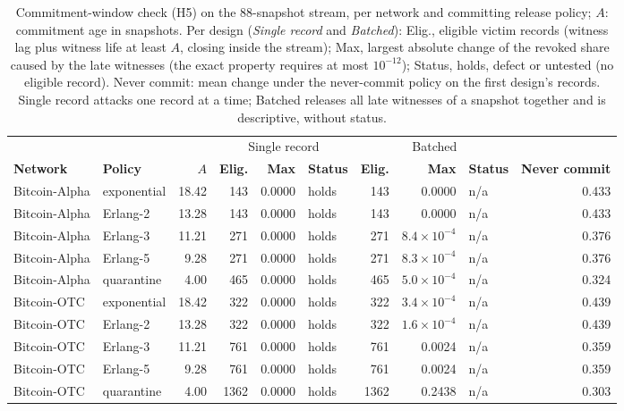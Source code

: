 \begin{table}[!t]
\centering
\scriptsize
\setlength{\tabcolsep}{3pt}
\caption{Commitment-window check (H5) on the 88-snapshot stream, per network and committing release policy; $A$: commitment age in snapshots. Per design (\emph{Single record} and \emph{Batched}): Elig., eligible victim records (witness lag plus witness life at least $A$, closing inside the stream); Max, largest absolute change of the revoked share caused by the late witnesses (the exact property requires at most $10^{-12}$); Status, holds, defect or untested (no eligible record). Never commit: mean change under the never-commit policy on the first design's records. Single record attacks one record at a time; Batched releases all late witnesses of a snapshot together and is descriptive, without status.}
\label{tab:s_s_window_88}
\begin{tabular}{@{}llrrrlrrlr@{}}
\toprule
 & & & \multicolumn{3}{c}{Single record} & \multicolumn{3}{c}{Batched} & \\
\cmidrule(lr){4-6}\cmidrule(lr){7-9}
\textbf{Network} & \textbf{Policy} & \textbf{$A$} & \textbf{Elig.} & \textbf{Max} & \textbf{Status} & \textbf{Elig.} & \textbf{Max} & \textbf{Status} & \textbf{Never commit} \\
\midrule
Bitcoin-Alpha & exponential & 18.42 & 143 & 0.0000 & holds & 143 & 0.0000 & n/a & 0.433 \\
Bitcoin-Alpha & Erlang-2 & 13.28 & 143 & 0.0000 & holds & 143 & 0.0000 & n/a & 0.433 \\
Bitcoin-Alpha & Erlang-3 & 11.21 & 271 & 0.0000 & holds & 271 & $8.4\times10^{-4}$ & n/a & 0.376 \\
Bitcoin-Alpha & Erlang-5 & 9.28 & 271 & 0.0000 & holds & 271 & $8.3\times10^{-4}$ & n/a & 0.376 \\
Bitcoin-Alpha & quarantine & 4.00 & 465 & 0.0000 & holds & 465 & $5.0\times10^{-4}$ & n/a & 0.324 \\
Bitcoin-OTC & exponential & 18.42 & 322 & 0.0000 & holds & 322 & $3.4\times10^{-4}$ & n/a & 0.439 \\
Bitcoin-OTC & Erlang-2 & 13.28 & 322 & 0.0000 & holds & 322 & $1.6\times10^{-4}$ & n/a & 0.439 \\
Bitcoin-OTC & Erlang-3 & 11.21 & 761 & 0.0000 & holds & 761 & 0.0024 & n/a & 0.359 \\
Bitcoin-OTC & Erlang-5 & 9.28 & 761 & 0.0000 & holds & 761 & 0.0024 & n/a & 0.359 \\
Bitcoin-OTC & quarantine & 4.00 & 1362 & 0.0000 & holds & 1362 & 0.2438 & n/a & 0.303 \\

\end{tabular}
\end{table}
